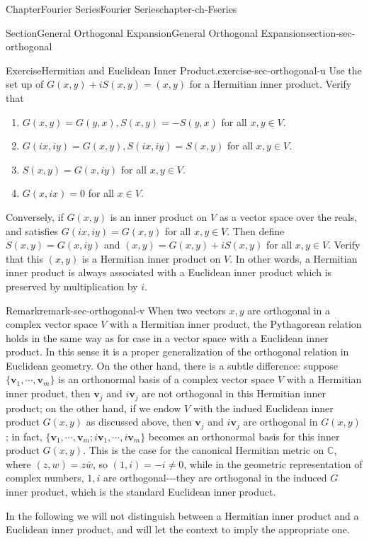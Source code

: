\documentclass[oneside,10pt,]{book}
\numberwithin{equation}{section}
\newcommand{\bv}{\mathbf{v}}
\newcommand{\bbC}{\mathbb{C}}
\begin{document}
\begin{chapterptx}{Chapter}{Fourier Series}{}{Fourier Series}{}{}{chapter-ch-Fseries}
\begin{sectionptx}{Section}{General Orthogonal Expansion}{}{General Orthogonal Expansion}{}{}{section-sec-orthogonal}
\begin{inlineexercise}{Exercise}{Hermitian and Euclidean Inner Product.}{exercise-sec-orthogonal-u}
Use the set up of \(G(x, y)+iS(x, y)=(x, y)\) for a Hermitian inner product. Verify that%
\begin{enumerate}
\item{}\(G(x, y)=G(y, x), S(x,y)=-S(y,x )\) for all \(x, y\in V\).%
\item{}\(G(i x, i y)=G(x, y), S(i x, i y)=S(x, y)\) for all \(x, y\in V\).%
\item{}\(S(x, y)=G(x, i y)\) for all \(x, y\in V\).%
\item{}\(G(x, ix)=0\) for all \(x\in V\).%
\end{enumerate}
%
\par
Conversely, if \(G(x, y)\) is an inner product on \(V\) as a vector space over the reals, and satisfies \(G(i x, i y)=G(x, y)\) for all \(x, y\in V\). Then define \(S(x, y)= G(x, i y)\) and \((x, y)=G(x, y)+ i S(x, y)\) for all \(x, y\in V\). Verify that this \((x, y)\) is a Hermitian inner product on \(V\). In other words, a Hermitian inner product is always associated with a Euclidean inner product which is preserved by multiplication by \(i\).%
\end{inlineexercise}%
\begin{remark}{Remark}{}{remark-sec-orthogonal-v}%
When two vectors \(x, y\) are orthogonal in a complex vector space \(V\) with a Hermitian inner product, the Pythagorean relation holds in the same way as for case in a vector space with a Euclidean inner product.  In this sense it is a proper generalization of the orthogonal relation in Euclidean geometry. On the other hand, there is a subtle difference: suppose \(\{\bv_{1},\cdots, \bv_{m}\}\) is an orthonormal basis of a complex vector space \(V\) with a Hermitian inner product, then \(\bv_{j}\) and \(i \bv_{j}\) are not orthogonal in  this Hermitian inner product; on the other hand, if we endow \(V\) with the indued Euclidean inner product \(G(x, y)\) as discussed above, then \(\bv_{j}\) and \(i \bv_{j}\) are  orthogonal in \(G(x, y)\); in fact, \(\{ \bv_{1},\cdots, \bv_{m}; i \bv_{1},\cdots, i \bv_{m}\}\) becomes an orthonormal basis for this inner product \(G(x, y)\). This is the case for the canonical Hermitian metric on \(\bbC\), where \((z, w)=z \bar w\), so \((1, i)=-i \ne 0\), while in the geometric representation of complex numbers, \(1, i\) are orthogonal-{}-{}-they are orthogonal in the induced \(G\) inner product, which is the standard Euclidean inner product.\end{remark}
In the following we will not distinguish between a Hermitian inner product and a Euclidean inner product, and will let the context to imply the appropriate one.%

\end{sectionptx}
\end{chapterptx}
\end{document}
